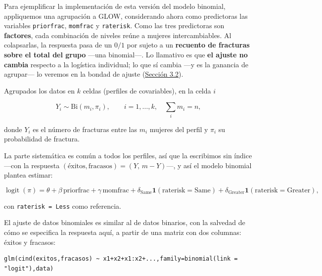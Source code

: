 \documentclass[
  letterpaper,
  DIV=11,
  numbers=noendperiod]{scrartcl}
\begin{document}
Para ejemplificar la implementación de esta versión del modelo binomial,
appliquemos una agrupación a GLOW, considerando ahora como predictoras
las variables \texttt{priorfrac}, \texttt{momfrac} y \texttt{raterisk}.
Como las tres predictoras son \textbf{factores}, cada combinación de
niveles reúne a mujeres intercambiables. Al colapsarlas, la respuesta
pasa de un \(0/1\) por sujeto a un \textbf{recuento de fracturas sobre
el total del grupo} ---una binomial---. Lo llamativo es que \textbf{el
ajuste no cambia} respecto a la logística individual; lo que sí cambia
---y es la ganancia de agrupar--- lo veremos en la bondad de ajuste
(\protect\hyperlink{sec-u13-gof-binomial}{Sección 3.2}).

Agrupados los datos en \(k\) celdas (perfiles de covariables), en la
celda \(i\)

\[Y_i \sim \mathrm{Bi}(m_i,\pi_i), \qquad i=1,\dots,k,\quad \textstyle\sum_i m_i=n,\]

donde \(Y_i\) es el número de fracturas entre las \(m_i\) mujeres del
perfil y \(\pi_i\) su probabilidad de fractura.

La parte sistemática es común a todos los perfiles, así que la
escribimos sin índice ---con la respuesta
\((\text{éxitos},\text{fracasos})=(Y,\,m-Y)\)---, y así el modelo
binomial plantea estimar:

\[\operatorname{logit}(\pi)=\theta+\beta\,\text{priorfrac}+\gamma\,\text{momfrac}+\delta_{\text{Same}}\mathbf 1(\text{raterisk}=\text{Same})+\delta_{\text{Greater}}\mathbf 1(\text{raterisk}=\text{Greater}),\]

con \texttt{raterisk\ =\ Less} como referencia.

\begin{tcolorbox}[enhanced jigsaw, breakable, colframe=quarto-callout-tip-color-frame, left=2mm, arc=.35mm, colbacktitle=quarto-callout-tip-color!10!white, toprule=.15mm, colback=white, coltitle=black, rightrule=.15mm, opacitybacktitle=0.6, title=\textcolor{quarto-callout-tip-color}{\faLightbulb}\hspace{0.5em}{🔧 En R. El \texttt{glm()} con datos binomiales}, titlerule=0mm, toptitle=1mm, bottomtitle=1mm, leftrule=.75mm, bottomrule=.15mm, opacityback=0]

El ajuste de datos binomiales es similar al de datos binarios, con la
salvedad de cómo se especifica la respuesta aquí, a partir de una matriz
con dos columnas: éxitos y fracasos:

\begin{verbatim}
glm(cind(exitos,fracasos) ~ x1+x2+x1:x2+...,family=binomial(link = "logit"),data)
\end{verbatim}

\end{tcolorbox}
\end{document}
